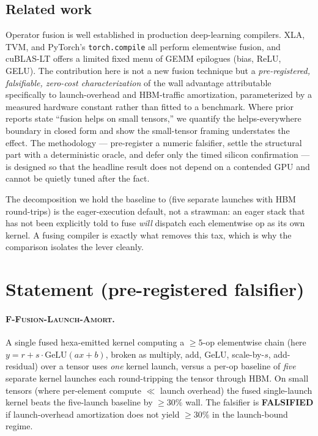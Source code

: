 \documentclass[11pt,a4paper]{article}
\newcommand{\falsifier}{\textsc{F-Fusion-Launch-Amort}}
\begin{document}
\subsection{Related work}

Operator fusion is well established in production deep-learning compilers.
XLA, TVM, and PyTorch's \texttt{torch.compile} all perform elementwise fusion,
and cuBLAS-LT offers a limited fixed menu of GEMM epilogues (bias, ReLU,
GELU). The contribution here is not a new fusion technique but a
\emph{pre-registered, falsifiable, zero-cost characterization} of the wall
advantage attributable specifically to launch-overhead and HBM-traffic
amortization, parameterized by a measured hardware constant rather than fitted
to a benchmark. Where prior reports state ``fusion helps on small tensors,''
we quantify the helps-everywhere boundary in closed form and show the
small-tensor framing understates the effect. The methodology --- pre-register a
numeric falsifier, settle the structural part with a deterministic oracle, and
defer only the timed silicon confirmation --- is designed so that the headline
result does not depend on a contended GPU and cannot be quietly tuned after the
fact.

The decomposition we hold the baseline to (five separate launches with HBM
round-trips) is the eager-execution default, not a strawman: an eager stack
that has not been explicitly told to fuse \emph{will} dispatch each elementwise
op as its own kernel. A fusing compiler is exactly what removes this tax, which
is why the comparison isolates the lever cleanly.

\section{Statement (pre-registered falsifier)}
\label{sec:statement}

\paragraph{\falsifier.} A single fused hexa-emitted kernel computing a
$\ge 5$-op elementwise chain (here $y = r + s\cdot\mathrm{GeLU}(a x + b)$,
broken as multiply, add, GeLU, scale-by-$s$, add-residual) over a tensor uses
\emph{one} kernel launch, versus a per-op baseline of \emph{five} separate
kernel launches each round-tripping the tensor through HBM. On small tensors
(where per-element compute $\ll$ launch overhead) the fused single-launch
kernel beats the five-launch baseline by $\ge 30\%$ wall. The falsifier is
\textbf{FALSIFIED} if launch-overhead amortization does not yield $\ge 30\%$ in
the launch-bound regime.
\end{document}
